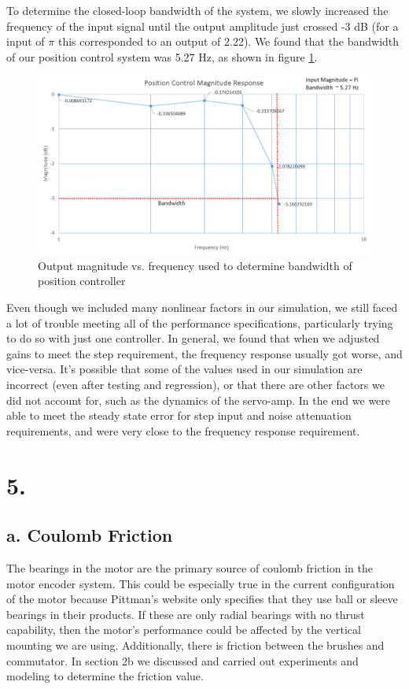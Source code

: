 \documentclass{article}
\theoremstyle{plain}
\theoremstyle{definition}
\theoremstyle{remark}
\begin{document}
To determine the closed-loop bandwidth of the system, we slowly increased the frequency of the input signal until the output amplitude just crossed -3 dB (for a input of $\pi$ this corresponded to an output of 2.22). We found that the bandwidth of our position control system was 5.27 Hz, as shown in figure \ref{PosBandwidth}.

\begin{figure}[htb]
\begin{center}
\includegraphics[width = 14cm]{PositionControl_Magnitude.png}
\caption{Output magnitude vs. frequency used to determine bandwidth of position controller}
\label{PosBandwidth}
\end{center}
\end{figure}

Even though we included many nonlinear factors in our simulation, we still faced a lot of trouble meeting all of the performance specifications, particularly trying to do so with just one controller. In general, we found that when we adjusted gains to meet the step requirement, the frequency response usually got worse, and vice-versa. It's possible that some of the values used in our simulation are incorrect (even after testing and regression), or that there are other factors we did not account for, such as the dynamics of the servo-amp. In the end we were able to meet the steady state error for step input and noise attenuation requirements, and were very close to the frequency response requirement.

\section*{5.}

\subsection*{a. Coulomb Friction}
The bearings in the motor are the primary source of coulomb friction in the motor encoder system. This could be especially true in the current configuration of the motor because Pittman's website only specifies that they use ball or sleeve bearings in their products. If these are only radial bearings with no thrust capability, then the motor's performance could be affected by the vertical mounting we are using. Additionally, there is friction between the brushes and commutator. In section 2b we discussed and carried out experiments and modeling to determine the friction value.   
\end{document}
